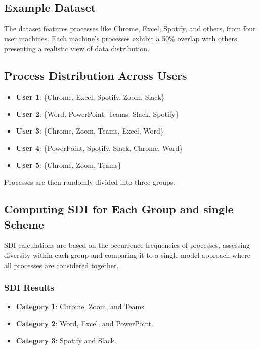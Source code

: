 \subsection*{Example Dataset}

The dataset features processes like Chrome, Excel, Spotify, and others, from four user machines. Each machine's processes exhibit a 50\% overlap with others, presenting a realistic view of data distribution.

\subsection*{Process Distribution Across Users}

\begin{itemize}
    \item \textbf{User 1}: \{Chrome, Excel, Spotify, Zoom, Slack\}
    \item \textbf{User 2}: \{Word, PowerPoint, Teams, Slack, Spotify\}
    \item \textbf{User 3}: \{Chrome, Zoom, Teams, Excel, Word\}
    \item \textbf{User 4}: \{PowerPoint, Spotify, Slack, Chrome, Word\}
    \item \textbf{User 5}: \{Chrome, Zoom, Teams\}

\end{itemize}

Processes are then randomly divided into three groups.

\subsection*{Computing SDI for Each Group and single  Scheme}

SDI calculations are based on the occurrence frequencies of processes, assessing diversity within each group and comparing it to a single  model approach where all processes are considered together.

\subsubsection*{SDI Results}

\begin{itemize}
    \item \textbf{Category 1}: {Chrome, Zoom, and Teams}.
    \item \textbf{Category 2}: {Word, Excel, and PowerPoint}.
    \item \textbf{Category 3}: {Spotify and Slack}.
\end{itemize}

